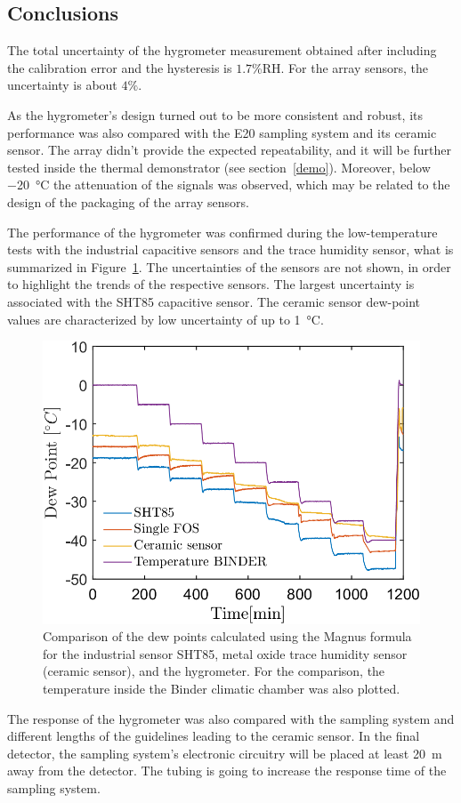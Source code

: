 \subsection{Conclusions}
The total uncertainty of the hygrometer measurement obtained after including the calibration error and the hysteresis is $1.7$\%RH. For the array sensors, the uncertainty is about $4\%$.


As the hygrometer's design turned out to be more consistent and robust, its performance was also compared with the E20 sampling system\cite{michell_e20} and its ceramic sensor. The array didn't provide the expected repeatability, and it  will be further tested inside the thermal demonstrator (see section~\ref{demo}). Moreover, below \SI{-20}{\celsius} the attenuation of the signals was observed, which may be related to the design of the packaging of the array sensors.

The performance of the hygrometer was confirmed during the low-temperature tests with the industrial capacitive sensors and the trace humidity sensor, what is summarized in Figure~\ref{fig_comparison}. The uncertainties of the sensors are not shown, in order to highlight the trends of the respective sensors. The largest uncertainty is associated with the SHT85 capacitive sensor. The ceramic sensor dew-point values are characterized by low uncertainty of up to \SI{1}{\celsius}.  
\begin{figure}[!h]
\centering
\includegraphics[width=0.6\columnwidth]{Chapter5/images/DPCPercent.png}
\caption{Comparison of the dew points calculated using the Magnus formula for the industrial sensor SHT85, metal oxide trace humidity sensor (ceramic sensor), and the hygrometer. For the comparison, the temperature inside the Binder climatic chamber was also plotted.}
\label{fig_comparison}
\end{figure}

The response of the hygrometer was also compared with the sampling system and different lengths of the guidelines leading to the ceramic sensor. In the final detector, the sampling system's electronic circuitry will be placed at least \SI{20}{\metre} away from the detector. The tubing is going to increase the response time of the sampling system. 

